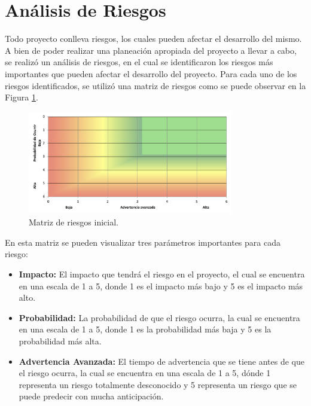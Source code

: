 \section{Análisis de Riesgos}

Todo proyecto conlleva riesgos, los cuales pueden afectar el desarrollo del
mismo. A bien de poder realizar una planeación apropiada del proyecto a llevar
a cabo, se realizó un análisis de riesgos, en el cual se identificaron los
riesgos más importantes que pueden afectar el desarrollo del proyecto. Para cada
uno de los riesgos identificados, se utilizó una matriz de riesgos como se puede
observar en la Figura \ref{fig:matriz_riesgos_inicial}.

\begin{figure}[H]
  \centering
  \includegraphics[width=0.8\textwidth]{imagenes/03-analisis/analisis-riesgos/matriz-riesgos-inicial.png}
  \caption{Matriz de riesgos inicial.}
  \label{fig:matriz_riesgos_inicial}
\end{figure}

En esta matriz se pueden visualizar tres parámetros importantes para cada riesgo:

\begin{itemize}
  \item \textbf{Impacto:} El impacto que tendrá el riesgo en el proyecto, el cual
  se encuentra en una escala de 1 a 5, donde 1 es el impacto más bajo y 5 es el
  impacto más alto.
  \item \textbf{Probabilidad:} La probabilidad de que el riesgo ocurra, la cual
  se encuentra en una escala de 1 a 5, donde 1 es la probabilidad más baja y 5 es
  la probabilidad más alta.
  \item \textbf{Advertencia Avanzada:} El tiempo de advertencia que se tiene
  antes de que el riesgo ocurra, la cual se encuentra en una escala de 1 a 5,
  dónde 1 representa un riesgo totalmente desconocido y 5 representa un riesgo
  que se puede predecir con mucha anticipación.
\end{itemize}

